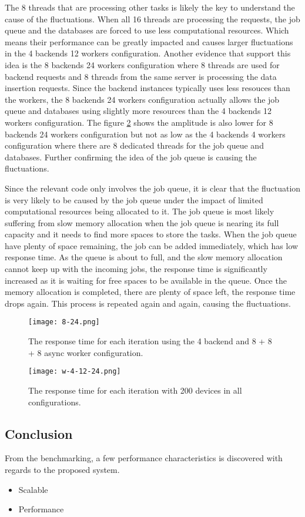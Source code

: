 \documentclass[../thesis.tex]{subfiles}
\begin{document}
The 8 threads that are processing other tasks is likely the key to understand the cause of the fluctuations. When all 16 threads are processing the requests, the job queue and the databases are forced to use less computational resources. Which means their performance can be greatly impacted and causes larger fluctuations in the 4 backends 12 workers configuration. Another evidence that support this idea is the 8 backends 24 workers configuration where 8 threads are used for backend requests and 8 threads from the same server is processing the data insertion requests. Since the backend instances typically uses less resouces than the workers, the 8 backends 24 workers configuration actually allows the job queue and databases using slightly more resources than the 4 backends 12 workers configuration. The figure \ref{fig:w-4-12-24} shows the amplitude is also lower for 8 backends 24 workers configuration but not as low as the 4 backends 4 workers configuration where there are 8 dedicated threads for the job queue and databases. Further confirming the idea of the job queue is causing the fluctuations. 

Since the relevant code only involves the job queue, it is clear that the fluctuation is very likely to be caused by the job queue under the impact of limited computational resources being allocated to it. The job queue is most likely suffering from slow memory allocation when the job queue is nearing its full capacity and it needs to find more spaces to store the tasks. When the job queue have plenty of space remaining, the job can be added immediately, which has low response time. As the queue is about to full, and the slow memory allocation cannot keep up with the incoming jobs, the response time is significantly increased as it is waiting for free spaces to be available in the queue. Once the memory allocation is completed, there are plenty of space left, the response time drops again. This process is repeated again and again, causing the fluctuations. 

\begin{figure}[!ht]
	\centering
	\texttt{[image: 8-24.png]}
	\caption{The response time for each iteration using the 4 backend and 8 + 8 + 8 async worker configuration.}
	\label{fig:8-24}
\end{figure}

\begin{figure}[!ht]
	\centering
	\texttt{[image: w-4-12-24.png]}
	\caption{The response time for each iteration with 200 devices in all configurations.}
	\label{fig:w-4-12-24}
\end{figure}

\subsection{Conclusion}

From the benchmarking, a few performance characteristics is discovered with regards to the proposed system. 

\begin{itemize}
	\item Scalable
	\item Performance 
\end{itemize}
\end{document}
